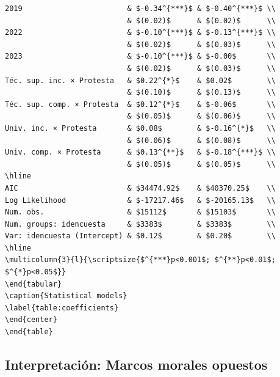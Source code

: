 \documentclass[
  12pt,
]{article}
\begin{document}
\begin{verbatim}
2019                        & $-0.34^{***}$ & $-0.40^{***}$ \\
                            & $(0.02)$      & $(0.02)$      \\
2022                        & $-0.10^{***}$ & $-0.13^{***}$ \\
                            & $(0.02)$      & $(0.03)$      \\
2023                        & $-0.10^{***}$ & $-0.00$       \\
                            & $(0.02)$      & $(0.03)$      \\
Téc. sup. inc. × Protesta   & $0.22^{*}$    & $0.02$        \\
                            & $(0.10)$      & $(0.13)$      \\
Téc. sup. comp. × Protesta  & $0.12^{*}$    & $-0.06$       \\
                            & $(0.05)$      & $(0.06)$      \\
Univ. inc. × Protesta       & $0.08$        & $-0.16^{*}$   \\
                            & $(0.06)$      & $(0.08)$      \\
Univ. comp. × Protesta      & $0.13^{**}$   & $-0.18^{***}$ \\
                            & $(0.05)$      & $(0.05)$      \\
\hline
AIC                         & $34474.92$    & $40370.25$    \\
Log Likelihood              & $-17217.46$   & $-20165.13$   \\
Num. obs.                   & $15112$       & $15103$       \\
Num. groups: idencuesta     & $3383$        & $3383$        \\
Var: idencuesta (Intercept) & $0.12$        & $0.20$        \\
\hline
\multicolumn{3}{l}{\scriptsize{$^{***}p<0.001$; $^{**}p<0.01$; $^{*}p<0.05$}}
\end{tabular}
\caption{Statistical models}
\label{table:coefficients}
\end{center}
\end{table}
\end{verbatim}

\subsection{Interpretación: Marcos morales
opuestos}\label{interpretaciuxf3n-marcos-morales-opuestos}
\end{document}
